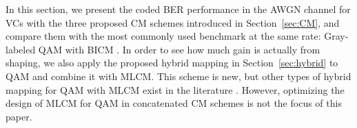 \documentclass[journal]{IEEEtran}
\begin{document}
% 
% 


% 
% 

In this section, we present the coded BER performance in the AWGN channel for VCs with the three proposed CM schemes introduced in Section~\ref{sec:CM}, and compare them with the most commonly used benchmark at the same rate: Gray-labeled QAM with BICM \cite{caire98,ifabregas08book,stern20,stern21}. In order to see how much gain is actually from shaping, we also apply the proposed hybrid mapping in Section~\ref{sec:hybrid} to QAM and combine it with MLCM. This scheme is new, but other types of hybrid mapping for QAM with MLCM exist in the literature \cite{isaka98,yuan6g21}. However, optimizing the design of MLCM for QAM in concatenated CM schemes is not the focus of this paper.
\end{document}
